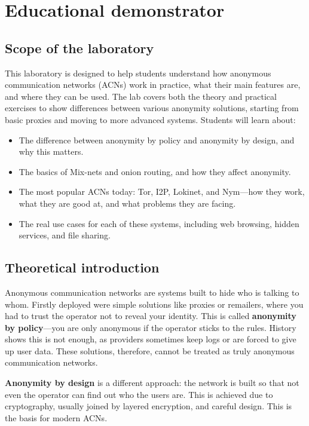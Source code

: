 \chapter{Educational demonstrator}

\section{Scope of the laboratory}
This laboratory is designed to help students understand how anonymous communication networks (ACNs) work in practice, what their main features are, and where they can be used. The lab covers both the theory and practical exercises to show differences between various anonymity solutions, starting from basic proxies and moving to more advanced systems. Students will learn about:
\begin{itemize}
    \item The difference between anonymity by policy and anonymity by design, and why this matters.
    \item The basics of Mix-nets and onion routing, and how they affect anonymity.
    \item The most popular ACNs today: Tor, I2P, Lokinet, and Nym—how they work, what they are good at, and what problems they are facing.
    \item The real use cases for each of these systems, including web browsing, hidden services, and file sharing.
\end{itemize}

\section{Theoretical introduction}
Anonymous communication networks are systems built to hide who is talking to whom. Firstly deployed were simple solutions like proxies or remailers, where you had to trust the operator not to reveal your identity. This is called \textbf{anonymity by policy}—you are only anonymous if the operator sticks to the rules. History shows this is not enough, as providers sometimes keep logs or are forced to give up user data. These solutions, therefore, cannot be treated as truly anonymous communication networks.

\textbf{Anonymity by design} is a different approach: the network is built so that not even the operator can find out who the users are. This is achieved due to cryptography, usually joined by layered encryption, and careful design. This is the basis for modern ACNs.

